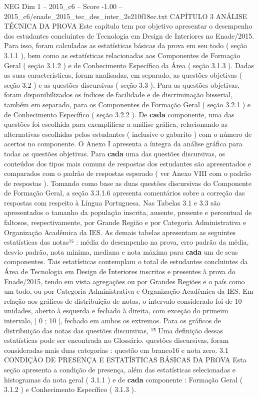 \begin{textsample}{NEG Dim 1 – 2015\_c6 – Score -1.00 – 2015\_c6/enade\_2015\_tec\_des\_inter\_2e210f18ec.txt}  \label{ex:f1_neg_286}
CAPÍTULO 3 ANÁLISE TÉCNICA DA PROVA Este capítulo tem por objetivo apresentar o desempenho dos estudantes concluintes de Tecnologia em Design de Interiores no Enade/2015.
Para isso, foram calculadas as estatísticas básicas da prova em seu todo ( seção 3.1.1 ), bem como as estatísticas relacionadas aos Componentes de Formação Geral ( seção 3.1.2 ) e de Conhecimento Específico da Área ( seção 3.1.3 ).
Dadas as suas características, foram analisadas, em separado, as questões objetivas ( seção 3.2 ) e as questões discursivas ( seção 3.3 ).
Para as questões objetivas, foram disponibilizados os índices de facilidade e de discriminação bisserial, também em separado, para os Componentes de Formação Geral ( seção 3.2.1 ) e de Conhecimento Específico ( seção 3.2.2 ).
De \textbf{cada} componente, uma das questões foi escolhida para exemplificar a análise gráfica, relacionando as alternativas escolhidas pelos estudantes ( inclusive o gabarito ) com o número de acertos no componente.
O Anexo I apresenta a íntegra da análise gráfica para todas as questões objetivas.
Para \textbf{cada} uma das questões discursivas, os conteúdos dos tipos mais comuns de respostas dos estudantes são apresentados e comparados com o padrão de respostas esperado ( ver Anexo VIII com o padrão de respostas ).
Tomando como base as duas questões discursivas do Componente de Formação Geral, a seção 3.3.1.6 apresenta comentários sobre a correção das respostas com respeito à Língua Portuguesa.
Nas Tabelas 3.1 e 3.3 são apresentados o tamanho da população inscrita, ausente, presente e percentual de faltosos, respectivamente, por Grande Região e por Categoria Administrativa e Organização Acadêmica da IES.
As demais tabelas apresentam as seguintes estatísticas das notas¹⁵ : média do desempenho na prova, erro padrão da média, desvio padrão, nota mínima, mediana e nota máxima para \textbf{cada} um de seus componentes.
Tais estatísticas contemplam o total de estudantes concluintes da Área de Tecnologia em Design de Interiores inscritos e presentes à prova do Enade/2015, tendo em vista agregações ou por Grandes Regiões e o país como um todo, ou por Categoria Administrativa e Organização Acadêmica da IES.
Em relação aos gráficos de distribuição de notas, o intervalo considerado foi de 10 unidades, aberto à esquerda e fechado à direita, com exceção do primeiro intervalo, [ 0 ; 10 ], fechado em ambos os extremos.
Para os gráficos de distribuição das notas das questões discursivas, ¹⁵ Uma definição dessas estatísticas pode ser encontrada no Glossário. questões discursivas, foram consideradas mais duas categorias : questão em branco16 e nota zero. 3.1 CONDIÇÃO DE PRESENÇA E ESTATÍSTICAS BÁSICAS DA PROVA Esta seção apresenta a condição de presença, além das estatísticas selecionadas e histogramas da nota geral ( 3.1.1 ) e de \textbf{cada} componente : Formação Geral ( 3.1.2 ) e Conhecimento Específico ( 3.1.3 ).

\end{textsample}
